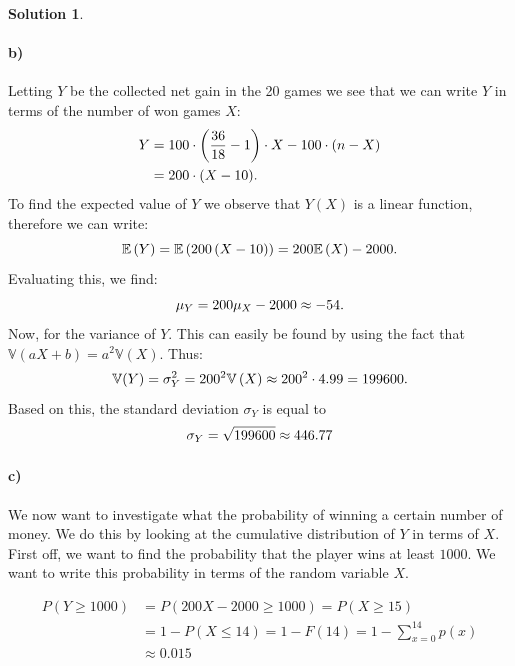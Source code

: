 \documentclass[a4paper]{article}
\theoremstyle{definition}
\newtheorem{sol}{Solution}
\begin{document}
\begin{sol}
\paragraph{b)}
Letting $Y$ be the collected net gain in the 20 games we see that we can write $Y$ in terms of
the number of won games $X$: 
\begin{align*}
  \notag
  Y &= 100 \cdot \left( \frac{36}{18} - 1 \right) \cdot X - 100\cdot\left( n - X \right)\\
    &= 200 \cdot (X - 10).
\end{align*}
To find the expected value of $Y$ we observe that $Y(X)$ is a linear function, therefore we can write:
\begin{equation}
  \notag
  \mathbb{E}\left( Y \right) = \mathbb{E}\left( 200\left( X-10 \right) \right) = 200\mathbb{E}\left( X \right) - 2000.
\end{equation}
Evaluating this, we find:
\begin{equation}
  \notag
  \mu_{Y} = 200\mu_{X} - 2000 \approx -54.
\end{equation}
Now, for the variance of $Y$. This can easily be found by using the fact that $\mathbb{V}(aX + b) = a^2\mathbb{V}(X)$.
Thus:
\begin{equation}
  \notag
  \mathbb{V}(Y) = \sigma_{Y}^{2} = 200^2 \mathbb{V}\left( X \right) \approx 200^{2} \cdot 4.99 = 199600.
\end{equation}
Based on this, the standard deviation $\sigma_{Y}$ is equal to
\begin{equation}
  \notag
  \sigma_{Y} = \sqrt{199600} \approx 446.77
\end{equation}

\paragraph{c)}
We now want to investigate what the probability of winning a certain number of money.
We do this by looking at the cumulative distribution of $Y$ in terms of $X$.
First off, we want to find the probability that the player wins at least $1000$.
We want to write this probability in terms of the random variable $X$.

\begin{align*}
  P(Y \geq 1000) &= P(200X - 2000 \geq 1000) = P(X \geq 15) \\
  &= 1 - P(X \leq 14) = 1 - F(14) =  1 - \sum_{x=0}^{14} p(x)\\
  &\approx 0.015 
\end{align*}


\end{sol}
\end{document}
